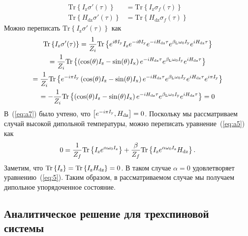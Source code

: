 \begin{align}
  \label{eq:a5}
  \mathrm{Tr} \left\{ I_\mathrm{z} \sigma'(\tau) \right\}
  & = \mathrm{Tr} \left\{ I_\mathrm{z} \sigma_{f}(\tau) \right\}
  \\
  \label{eq:a6}
  \mathrm{Tr} \left\{ H_\mathrm{dz} \sigma'(\tau) \right\}
  & = \mathrm{Tr} \left\{ H_\mathrm{dz} \sigma_{f}(\tau) \right\}
\end{align}
%
Можно переписать $\mathrm{Tr} \left\{ I_\mathrm{z} \sigma'(\tau) \right\}$ как
%
\begin{multline}
  \label{eq:a7}
  \mathrm{Tr} \left\{ I_\mathrm{z} \sigma'(\tau) \right\}
  = \dfrac{1}{Z_{i}} \mathrm{Tr} \left\{ 
    e^{i \theta I_\mathrm{y}} I_\mathrm{z} e^{-i \theta I_\mathrm{y}}
    e^{-i H_\mathrm{dz} \tau} e^{\beta_\mathrm{L} \omega_{0} I_\mathrm{y}} e^{i H_\mathrm{dz} \tau}
   \right\}
  \\
  = \dfrac{1}{Z_i} \mathrm{Tr} \left\{ 
    \left( \cos(\theta) I_\mathrm{z} - \sin(\theta) I_\mathrm{x} \right)
    e^{-i H_\mathrm{dz} \tau} e^{\beta_\mathrm{L} \omega_{0} I_\mathrm{y}} e^{i H_\mathrm{dz} \tau}
   \right\}
  \\
  = \dfrac{1}{Z_i} \mathrm{Tr} \left\{ 
    e^{-i \pi I_\mathrm{y}}
    \left( \cos(\theta) I_\mathrm{z} - \sin(\theta) I_\mathrm{x} \right)
    e^{-i H_\mathrm{dz} \tau} e^{\beta_\mathrm{L} \omega_{0} I_\mathrm{y}} e^{i H_\mathrm{dz} \tau}
    e^{i \pi I_\mathrm{y}}
   \right\}
  \\
  = - \dfrac{1}{Z_i} \mathrm{Tr} \left\{ 
    \left( \cos(\theta) I_\mathrm{z} - \sin(\theta) I_\mathrm{x} \right)
    e^{-i H_\mathrm{dz} \tau} e^{\beta_\mathrm{L} \omega_{0} I_\mathrm{y}} e^{i H_\mathrm{dz} \tau}
   \right\} = 0
\end{multline}
%
В~(\ref{eq:a7}) было учтено, что $\left[ e^{-i \pi I_\mathrm{y}}, H_\mathrm{dz} \right] = 0$.
Поскольку мы рассматриваем случай высокой дипольной температуры, можно переписать уравнение~(\ref{eq:a5}) как
\begin{equation}
  \label{eq:a8}
  0 = \dfrac{1}{Z_f} \mathrm{Tr} \left\{  I_\mathrm{z} e^{\alpha \omega_{0} I_\mathrm{z}} \right\}
  + \dfrac{\beta}{Z_f} \mathrm{Tr} \left\{ I_\mathrm{z} e^{\alpha \omega_{0} I_\mathrm{z}} H_\mathrm{dz} \right\}.
\end{equation}
%
Заметим, что $\mathrm{Tr} \left\{ I_\mathrm{z} \right\} = \mathrm{Tr} \left\{ I_\mathrm{z}H_\mathrm{dz} \right\} = 0$.
В таком случае $\alpha = 0$ удовлетворяет уравнению~(\ref{eq:5}).
Таким образом, в рассматриваемом случае мы получаем дипольное упорядоченное состояние.


\subsection{Аналитическое решение для трехспиновой системы}
\label{sec:3}

